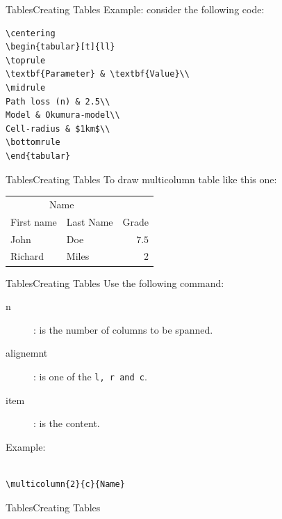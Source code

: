 \documentclass{beamer}
\begin{document}
\begin{darkframes}
\begin{frame}[fragile]{Tables}{Creating Tables}
	\alert{Example:} consider the following code:\
	\begin{verbatim}
\centering
\begin{tabular}[t]{ll}
\toprule
\textbf{Parameter} & \textbf{Value}\\
\midrule
Path loss (n) & 2.5\\
Model & Okumura-model\\
Cell-radius & $1km$\\
\bottomrule
\end{tabular}
	\end{verbatim}
\end{frame}



\begin{frame}[fragile]{Tables}{Creating Tables}
To draw multicolumn table like this one:\\
\centering

\begin{tabular}{llr}
	\toprule
	\multicolumn{2}{c}{Name} \\
	\cmidrule(lr){1-2}
	First name	& Last Name	& Grade \\
	\midrule
	John 		    & Doe	  		& $7.5$ \\
	Richard 	  & Miles		  & $2$ \\
	\bottomrule
\end{tabular}
\end{frame}

\begin{frame}[fragile]{Tables}{Creating Tables}
	Use the following command: \texttt{}
	\begin{description}
		\item [n]: is the number of columns to be spanned.
		\item [alignemnt]: is one of the \texttt{l, r and c}.
		\item [item]: is the content.
	\end{description}
\alert{Example:}
\begin{verbatim}

\multicolumn{2}{c}{Name} 

\end{verbatim}

\end{frame}

\begin{frame}[fragile]{Tables}{Creating Tables}


\end{frame}
\end{darkframes}
\end{document}
